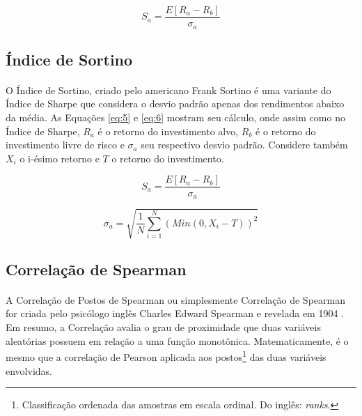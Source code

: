 \begin{equation} \label{eq:1}
    S_a = \frac{E[R_a - R_b]}{\sigma_a}
\end{equation}

\subsection{Índice de Sortino}

\paragraph{} O Índice de Sortino, criado pelo americano Frank Sortino \cite{rollinger2013sortino} é uma variante do Índice de Sharpe que considera o desvio padrão apenas dos rendimentos abaixo da média. As Equações \ref{eq:5} e \ref{eq:6} mostram seu cálculo, onde assim como no Índice de Sharpe, \begin{math}R_a\end{math} é o retorno do investimento alvo, \begin{math}R_b\end{math} é o retorno do investimento livre de risco e \begin{math}\sigma_a\end{math} seu respectivo desvio padrão. Considere também \begin{math}X_i\end{math} o i-ésimo retorno e \begin{math}T\end{math} o retorno do investimento.

\begin{equation} \label{eq:5}
    S_a = \frac{E[R_a - R_b]}{\sigma_a}
\end{equation}

\begin{equation} \label{eq:6}
    \sigma_a = \sqrt{ \frac{1}{N} \sum_{i=1}^{N} (Min(0, X_i-T))^2}
\end{equation}

\subsection{Correlação de Spearman}

\paragraph{} A Correlação de Postos de Spearman ou simplesmente Correlação de Spearman for criada pelo psicólogo inglês Charles Edward Spearman e revelada em 1904 \cite{spearman1961proof}. Em resumo, a Correlação avalia o grau de proximidade que duas variáveis aleatórias possuem em relação a uma função monotônica. Matematicamente, é o mesmo que a correlação de Pearson aplicada aos postos\footnote{Classificação ordenada das amostras em escala ordinal. Do inglês: \textit{ranks}.} das duas variáveis envolvidas.

